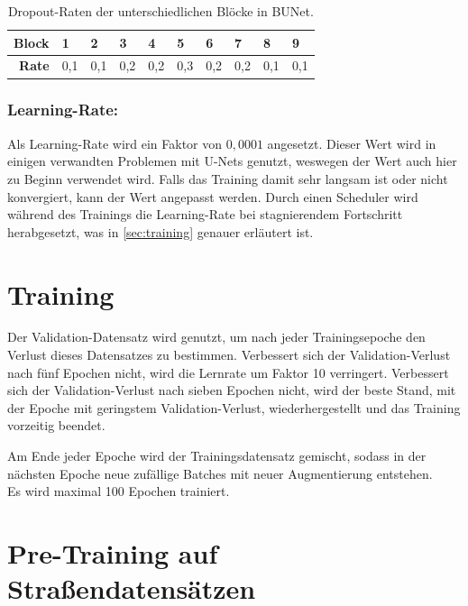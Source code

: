 \begin{table}[ht]
	\centering
	\begin{tabular}{r|ll|ll|l|ll|ll}
		\textbf{Block} & 1 & 2 & 3 & 4 & 5  & 6 & 7 & 8 & 9 \\
		\midrule
		\textbf{Rate} & 0,1 & 0,1 & 0,2 & 0,2 & 0,3 & 0,2 & 0,2 & 0,1 & 0,1 \\ 
	\end{tabular}
	\caption{Dropout-Raten der unterschiedlichen Blöcke in \ac{BUNet}.}
	\label{tab:dropout}
\end{table}

\subsubsection{Learning-Rate:}

Als Learning-Rate wird ein Faktor von $0,0001$ angesetzt. Dieser Wert wird in einigen verwandten Problemen mit U-Nets genutzt, 
weswegen der Wert auch hier zu Beginn verwendet wird. Falls das Training damit sehr langsam ist oder nicht konvergiert, 
kann der Wert angepasst werden. Durch einen Scheduler wird während des Trainings die Learning-Rate bei stagnierendem Fortschritt 
herabgesetzt, was in \autoref{sec:training} genauer erläutert ist. 

\section{Training} \label{sec:training}

Der Validation-Datensatz wird genutzt, um nach jeder Trainingsepoche den Verlust dieses Datensatzes zu bestimmen. 
Verbessert sich der Validation-Verlust nach fünf Epochen nicht, wird die Lernrate um Faktor 10 verringert. 
Verbessert sich der Validation-Verlust nach sieben Epochen nicht, wird der beste Stand, mit der Epoche mit geringstem 
Validation-Verlust, wiederhergestellt und das Training vorzeitig beendet.  

Am Ende jeder Epoche wird der Trainingsdatensatz gemischt, sodass in der nächsten Epoche neue zufällige 
Batches mit neuer Augmentierung entstehen. \\
Es wird maximal 100 Epochen trainiert.

\section{Pre-Training auf Straßendatensätzen} \label{sec:pre-training-roads}


